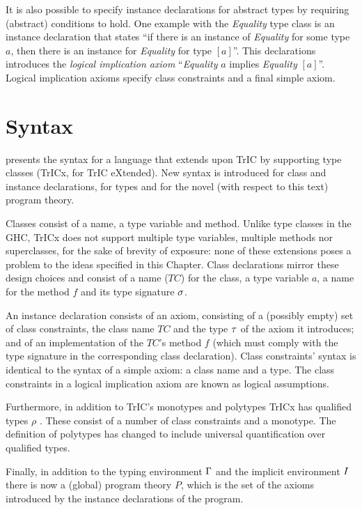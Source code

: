 It is also possible to specify instance declarations for abstract types by requiring (abstract) conditions to hold. One example with the \textit{Equality} type class is an instance declaration that states ``if there is an instance of \textit{Equality} for some type $a$, then there is an instance for \textit{Equality} for type $[a]$''. This declarations introduces the \textit{logical implication axiom} ``\textit{Equality} $a$ implies \textit{Equality} $[a]$''. Logical implication axioms specify class constraints and a final simple axiom.

\section{Syntax}
\label{7.2}
 presents the syntax for a language that extends upon TrIC by supporting type classes (TrICx, for TrIC eXtended). New syntax is introduced for class and instance declarations, for types and for the novel (with respect to this text) program theory. 

Classes consist of a name, a type variable and method. Unlike type classes in the GHC, TrICx does not support multiple type variables, multiple methods nor superclasses, for the sake of brevity of exposure: none of these extensions poses a problem to the ideas specified in this Chapter. Class declarations mirror these design choices and consist of a name ($TC$) for the class, a type variable $a$, a name for the method $f$ and its type signature $\mathit{\sigma}$.

An instance declaration consists of an axiom, consisting of a (possibly empty) set of class constraints, the class name $TC$ and the type $\mathit{\tau}$ of the axiom it introduces; and of an implementation of the $TC$'s method $f$ (which must comply with the type signature in the corresponding class declaration). Class constraints' syntax is identical to the syntax of a simple axiom: a class name and a type. The class constraints in a logical implication axiom are known as logical assumptions.

Furthermore, in addition to TrIC's monotypes and polytypes TrICx has qualified types $\rho$ \cite{qualified, qual2}. These consist of a number of class constraints and a monotype. The definition of polytypes has changed to include universal quantification over qualified types.

Finally, in addition to the typing environment $\Gamma$ and the implicit environment $I$ there is now a (global) program theory $P$, which is the set of the axioms introduced by the instance declarations of the program.

